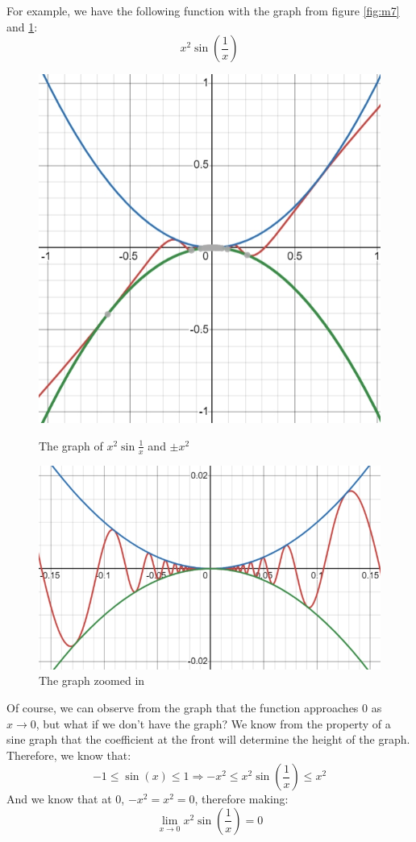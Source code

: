 For example, we have the following function with the graph from figure \ref{fig:m7} and \ref{fig:m6}:
\[ x^2 \sin\left( \frac{1}{x} \right) \]
\begin{figure}
    \centering
    \begin{minipage}{.4\textwidth}
        \centering
        \includegraphics[width=0.75\linewidth]{math/7.png}
        \caption{The graph of $x^2\sin{\frac{1}{x}}$ and $\pm x^2$}
        \label{fig:m7}
    \end{minipage}
    \begin{minipage}{.4\textwidth}
        \centering
        \includegraphics[width=1\linewidth]{math/6.png}
        \caption{The graph zoomed in}
        \label{fig:m6}
    \end{minipage}
\end{figure}

Of course, we can observe from the graph that the function approaches $0$ as $x\to0$, but what if we don't have the graph? We know from the property of a sine graph that the coefficient at the front will determine the height of the graph. Therefore, we know that:
\[
    -1 \leq \sin(x) \leq 1
    \Rightarrow
    -x^2 \leq x^2 \sin\left( \frac{1}{x} \right) \leq x^2
\]
And we know that at $0$, $-x^2 = x^2 = 0$, therefore making:
\[ \lim_{x\to0} x^2 \sin\left( \frac{1}{x} \right) = 0\]

